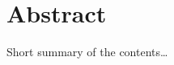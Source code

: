 
\begingroup
\let\clearpage\relax
\let\cleardoublepage\relax
\let\cleardoublepage\relax

\chapter*{Abstract} %

Short summary of the contents\dots

\endgroup

\vfill
